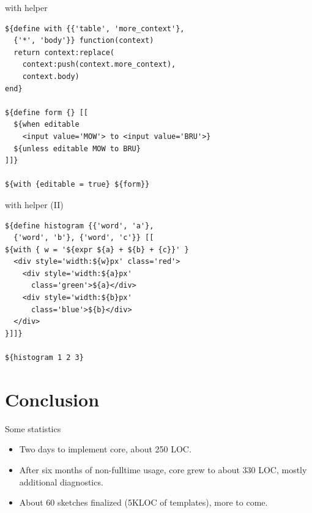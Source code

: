 \documentclass[aspectratio=43,handout,bigger]{beamer}
\begin{document}

\begin{frame}[fragile]{with helper}
\begin{verbatim}
${define with {{'table', 'more_context'},
  {'*', 'body'}} function(context)
  return context:replace(
    context:push(context.more_context),
    context.body)
end}

${define form {} [[
  ${when editable
    <input value='MOW'> to <input value='BRU'>}
  ${unless editable MOW to BRU}
]]}

${with {editable = true} ${form}}
\end{verbatim}
\end{frame}


\begin{frame}[fragile]{with helper (II)}
\begin{verbatim}
${define histogram {{'word', 'a'},
  {'word', 'b'}, {'word', 'c'}} [[
${with { w = '${expr ${a} + ${b} + {c}}' }
  <div style='width:${w}px' class='red'>
    <div style='width:${a}px'
      class='green'>${a}</div>
    <div style='width:${b}px'
      class='blue'>${b}</div>
  </div>
}]]}

${histogram 1 2 3}
\end{verbatim}
\end{frame}

\section{Conclusion}

\begin{frame}{Some statistics}
  \begin{itemize}
    \item Two days to implement core, about 250 LOC.
    \item After six months of non-fulltime usage, core grew to about 330 LOC,
          mostly additional diagnostics.
    \item About 60 sketches finalized (5KLOC of templates), more to come.
  \end{itemize}
\end{frame}

\end{document}
